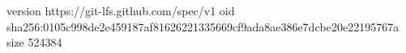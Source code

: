version https://git-lfs.github.com/spec/v1
oid sha256:0105c998de2e459187af81626221335669cf9ada8ae386e7dcbe20e22195767a
size 524384
